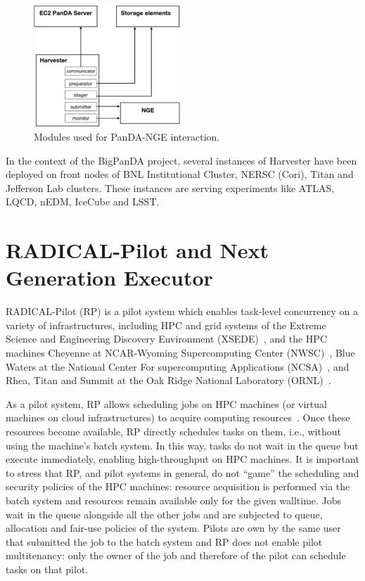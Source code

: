 \documentclass{webofc}
\begin{document}
\begin{figure}
  \centering
  \includegraphics[width=0.49\textwidth]{figures/panda-harvester-modules.pdf}
  \caption{Modules used for PanDA-NGE interaction.}
  \label{fig:harvester-modules}
\end{figure}

In the context of the BigPanDA project, several instances of Harvester have
been deployed on front nodes of BNL Institutional Cluster, NERSC (Cori),
Titan and Jefferson Lab clusters. These instances are serving experiments
like ATLAS, LQCD, nEDM, IceCube and LSST.


\section{RADICAL-Pilot and Next Generation Executor}\label{sec:rp}

RADICAL-Pilot (RP) is a pilot system which enables task-level concurrency on
a variety of infrastructures, including HPC and grid systems of the Extreme
Science and Engineering Discovery Environment (XSEDE)~\cite{towns2014xsede},
and the HPC machines Cheyenne at NCAR-Wyoming Supercomputing Center
(NWSC)~\cite{cheyenne}, Blue Waters at the National Center For supercomputing
Applications (NCSA)~\cite{bluewaters}, and Rhea, Titan and Summit at the Oak
Ridge National Laboratory (ORNL)~\cite{olcf-resources}.

As a pilot system, RP allows scheduling jobs on HPC machines (or virtual
machines on cloud infrastructures) to acquire computing
resources~\cite{turilli2018comprehensive}. Once these resources become
available, RP directly schedules tasks on them, i.e., without using the
machine’s batch system. In this way, tasks do not wait in the queue but
execute immediately, enabling high-throughput on HPC machines. It is
important to stress that RP, and pilot systems in general, do not ``game''
the scheduling and security policies of the HPC machines: resource
acquisition is performed via the batch system and resources remain available
only for the given walltime. Jobs wait in the queue alongside all the other
jobs and are subjected to queue, allocation and fair-use policies of the
system. Pilots are own by the same user that submitted the job to the batch
system and RP does not enable pilot multitenancy: only the owner of the job
and therefore of the pilot can schedule tasks on that pilot.
	
\end{document}

